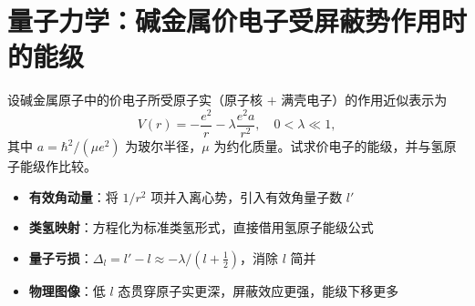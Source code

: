 \section{量子力学：碱金属价电子受屏蔽势作用时的能级}
\label{sec:alkali-screened-potential}

\begin{modelbox}[题目：碱金属价电子受屏蔽势作用时的能级]
设碱金属原子中的价电子所受原子实（原子核 $+$ 满壳电子）的作用近似表示为
\[
V(r)=-\frac{e^2}{r}-\lambda\frac{e^2a}{r^2},\quad 0<\lambda\ll1,
\]
其中 $a=\hbar^2/(\mu e^2)$ 为玻尔半径，$\mu$ 为约化质量。试求价电子的能级，并与氢原子能级作比较。
\end{modelbox}

\begin{tipbox}[考点快速分析]
\begin{itemize}
    \item \textbf{有效角动量}：将 $1/r^2$ 项并入离心势，引入有效角量子数 $l'$
    \item \textbf{类氢映射}：方程化为标准类氢形式，直接借用氢原子能级公式
    \item \textbf{量子亏损}：$\Delta_l=l'-l\approx-\lambda/(l+\frac12)$，消除 $l$ 简并
    \item \textbf{物理图像}：低 $l$ 态贯穿原子实更深，屏蔽效应更强，能级下移更多
\end{itemize}
\end{tipbox}

